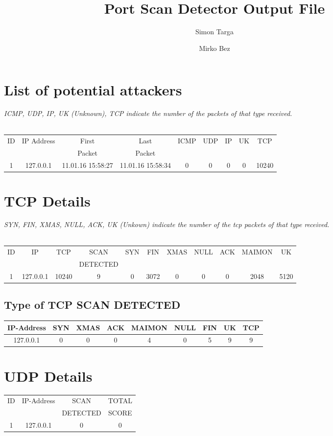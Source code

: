 \documentclass[a4paper]{scrartcl}
\author{Simon Targa \and Mirko Bez}
\title{Port Scan Detector Output File}
\begin{document}
\maketitle{}
\tableofcontents
\newpage
\section{List of potential attackers}
\emph{ICMP, UDP, IP, UK (Unknown), TCP indicate the number of the packets of that type received.} \\ \\ 
\begin{tabular}{| c | c | c | c | c | c | c | c | c | }
	\hline
	ID & IP Address & First & Last  & ICMP & UDP & IP & UK & TCP \\ 
   &            & Packet & Packet &     &    &    &     & \\ 
	\hline
	1 & 127.0.0.1 & 11.01.16 15:58:27 & 11.01.16 15:58:34 &   0 &   0 &   0 &   0 & 10240 \\ 
	\hline
\end{tabular}
\section{TCP Details}
\emph{SYN, FIN, XMAS, NULL, ACK, UK (Unkown) indicate the number of the tcp packets of that type received.} \\ \\ 
\begin{tabular}{| c | c | c | c | c | c | c | c | c | c | c | }
\hline 
ID & IP & TCP & SCAN & SYN  & FIN & XMAS & NULL & ACK & MAIMON & UK \\ 
 &  & & DETECTED &   &  &  &  &  & &  \\ 
\hline 
1 & 127.0.0.1 & 10240 &   9 &   0 & 3072 &   0 &   0 &   0 & 2048 & 5120\\ \hline
\end{tabular}
\subsection{Type of TCP SCAN DETECTED}
\begin{tabular}{| c | c | c | c | c | c | c | c | c | }
\hline 
IP-Address &  SYN & XMAS & ACK & MAIMON & NULL & FIN & UK & TCP \\ 
\hline 
127.0.0.1& 0 & 0 & 0 & 4 & 0 & 5 & 9 & 9  \\ 
 \hline
\end{tabular}
\section{UDP Details}
\begin{tabular}{| c | c | c | c |}
\hline 
ID & IP-Address & SCAN     & TOTAL \\ 
   &            & DETECTED & SCORE \\ 
\hline
1 & 127.0.0.1 & 0 & 0 \\ \hline 
\end{tabular}
\end{document}
